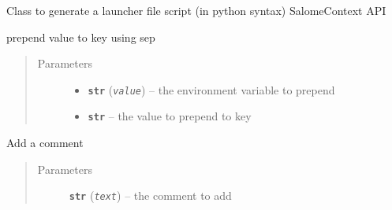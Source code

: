 \documentclass[a4paper,10pt,english]{sphinxmanual}
\begin{document}
\begin{fulllineitems}
\label{commands/apidoc/src:src.fileEnviron.LauncherFileEnviron}
Class to generate a launcher file script 
(in python syntax) SalomeContext API

\begin{fulllineitems}
\label{commands/apidoc/src:src.fileEnviron.LauncherFileEnviron.add}
prepend value to key using sep
\begin{quote}\begin{description}
\item[{Parameters}] \leavevmode\begin{itemize}
\item {} 
\textbf{\texttt{str}} (\emph{\texttt{value}}) -- the environment variable to prepend

\item {} 
\textbf{\texttt{str}} -- the value to prepend to key

\end{itemize}

\end{description}\end{quote}

\end{fulllineitems}


\begin{fulllineitems}
\label{commands/apidoc/src:src.fileEnviron.LauncherFileEnviron.add_comment}
\end{fulllineitems}


\begin{fulllineitems}
\label{commands/apidoc/src:src.fileEnviron.LauncherFileEnviron.add_echo}
Add a comment
\begin{quote}\begin{description}
\item[{Parameters}] \leavevmode
\textbf{\texttt{str}} (\emph{\texttt{text}}) -- the comment to add


\end{description}
\end{quote}
\end{fulllineitems}
\end{fulllineitems}
\end{document}
